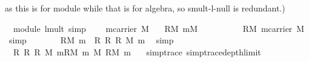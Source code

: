 \begin{isabellebody}
\begin{isamarkuptext}
as this is for module while that is for algebra, so smult-l-null is redundant.)%
\end{isamarkuptext}%
\isamarkuptrue%
\isamarkupfalse%
\ {\isacharparenleft}\ module{\isacharparenright}\ lmult{\isacharunderscore}{}\ {\isacharbrackleft}simp{\isacharbrackright}{\isacharcolon}\isanewline
\ \ \ {}{\isacharcolon}\ {\isachardoublequoteopen}m{\isasymin}carrier\ M{\isachardoublequoteclose}\isanewline
\ \ \ {\isachardoublequoteopen}{\isasymzero}\isactrlbsub R\isactrlesub {\isasymodot}\isactrlbsub M\isactrlesub \ m{\isacharequal}{\isasymzero}\isactrlbsub M\isactrlesub {\isachardoublequoteclose}\isanewline
%
\isadelimproof
%
\endisadelimproof
%
\isatagproof
{}\isamarkupfalse%
\ {\isacharminus}\ \isanewline
\ \ \isamarkupfalse%
\ {}\ \isamarkupfalse%
\ {}{\isacharcolon}\ {\isachardoublequoteopen}{\isasymzero}\isactrlbsub R\isactrlesub {\isasymodot}\isactrlbsub M\isactrlesub \ m{\isasymin}carrier\ M{\isachardoublequoteclose}\ \isamarkupfalse%
\ simp\isanewline
\ \ \isamarkupfalse%
\ {}\ \isamarkupfalse%
\ {}{\isacharcolon}\ {\isachardoublequoteopen}{\isasymzero}\isactrlbsub R\isactrlesub {\isasymodot}\isactrlbsub M\isactrlesub \ m\ {\isacharequal}\ {\isacharparenleft}{\isasymzero}\isactrlbsub R\isactrlesub \ {\isasymoplus}\isactrlbsub R\isactrlesub \ {\isasymzero}\isactrlbsub R\isactrlesub {\isacharparenright}\ {\isasymodot}\isactrlbsub M\isactrlesub \ m{\isachardoublequoteclose}\ \isamarkupfalse%
\ simp\isanewline
\ \ \isamarkupfalse%
\ {}\ \isamarkupfalse%
\ {}{\isacharcolon}\ {\isachardoublequoteopen}{\isacharparenleft}{\isasymzero}\isactrlbsub R\isactrlesub \ {\isasymoplus}\isactrlbsub R\isactrlesub \ {\isasymzero}\isactrlbsub R\isactrlesub {\isacharparenright}\ {\isasymodot}\isactrlbsub M\isactrlesub \ m{\isacharequal}{\isacharparenleft}{\isasymzero}\isactrlbsub R\isactrlesub {\isasymodot}\isactrlbsub M\isactrlesub \ m{\isacharparenright}\ {\isasymoplus}\isactrlbsub M\isactrlesub \ {\isacharparenleft}{\isasymzero}\isactrlbsub R\isactrlesub {\isasymodot}\isactrlbsub M\isactrlesub \ m{\isacharparenright}{\isachardoublequoteclose}\ \ \isamarkupfalse%
\ {\isacharbrackleft}{\isacharbrackleft}simp{\isacharunderscore}trace{\isacharcomma}\ simp{\isacharunderscore}trace{\isacharunderscore}depth{\isacharunderscore}limit{\isacharequal}{}{\isacharbrackright}{\isacharbrackright}\isanewline

\end{isabellebody}
